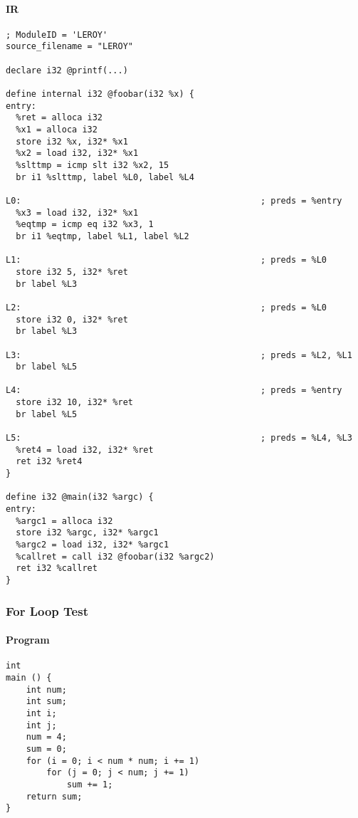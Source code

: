 \documentclass[12pt]{article}
\begin{document}
    \paragraph{IR}
    \begin{verbatim}
; ModuleID = 'LEROY'
source_filename = "LEROY"

declare i32 @printf(...)

define internal i32 @foobar(i32 %x) {
entry:
  %ret = alloca i32
  %x1 = alloca i32
  store i32 %x, i32* %x1
  %x2 = load i32, i32* %x1
  %slttmp = icmp slt i32 %x2, 15
  br i1 %slttmp, label %L0, label %L4

L0:                                               ; preds = %entry
  %x3 = load i32, i32* %x1
  %eqtmp = icmp eq i32 %x3, 1
  br i1 %eqtmp, label %L1, label %L2

L1:                                               ; preds = %L0
  store i32 5, i32* %ret
  br label %L3

L2:                                               ; preds = %L0
  store i32 0, i32* %ret
  br label %L3

L3:                                               ; preds = %L2, %L1
  br label %L5

L4:                                               ; preds = %entry
  store i32 10, i32* %ret
  br label %L5

L5:                                               ; preds = %L4, %L3
  %ret4 = load i32, i32* %ret
  ret i32 %ret4
}

define i32 @main(i32 %argc) {
entry:
  %argc1 = alloca i32
  store i32 %argc, i32* %argc1
  %argc2 = load i32, i32* %argc1
  %callret = call i32 @foobar(i32 %argc2)
  ret i32 %callret
}
    \end{verbatim}

    \newpage
    \subsubsection{For Loop Test}
    \paragraph{Program}
    \begin{verbatim}
int
main () {
    int num;
    int sum;
    int i;
    int j;
    num = 4;
    sum = 0;
    for (i = 0; i < num * num; i += 1)
        for (j = 0; j < num; j += 1)
            sum += 1;
    return sum;
}
    \end{verbatim}
\end{document}
